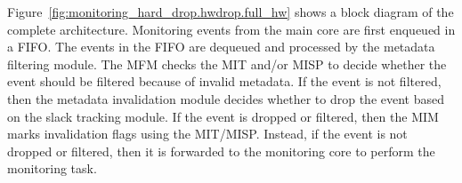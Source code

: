 Figure~\ref{fig:monitoring_hard_drop.hwdrop.full_hw} shows a block diagram of the complete
architecture.  Monitoring events from the main core are first enqueued in a
FIFO. The events in the FIFO are dequeued and processed by the metadata
filtering module. The MFM checks the MIT and/or MISP to decide whether the
event should be filtered because of invalid metadata. If the event is not
filtered, then the metadata invalidation module decides whether to drop the
event based on the slack tracking module. If the event is dropped or filtered,
then the MIM marks invalidation flags using the MIT/MISP. Instead, if the event
is not dropped or filtered, then it is forwarded to the monitoring core to
perform the monitoring task.
